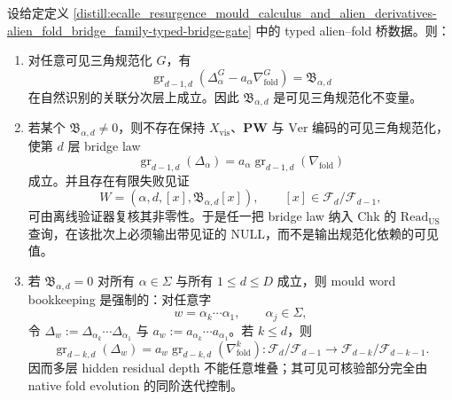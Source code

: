 \begin{theorem}\label{distill:ecalle_resurgence_mould_calculus_and_alien_derivatives-alien_fold_bridge_family-visible-null-bridge-defect-obstruction}
设给定定义 \ref{distill:ecalle_resurgence_mould_calculus_and_alien_derivatives-alien_fold_bridge_family-typed-bridge-gate} 中的 typed alien--fold 桥数据。则：
\begin{enumerate}
  \item 对任意可见三角规范化 \(G\)，有
  \[
  \operatorname{gr}_{d-1,d}(\Delta_\alpha^G-a_\alpha\nabla_{\mathrm{fold}}^G)=\mathfrak B_{\alpha,d}
  \]
  在自然识别的关联分次层上成立。因此 \(\mathfrak B_{\alpha,d}\) 是可见三角规范化不变量。
  \item 若某个 \(\mathfrak B_{\alpha,d}\neq 0\)，则不存在保持 \(X_{\mathrm{vis}}\)、\(\mathbf{PW}\) 与 \(\mathrm{Ver}\) 编码的可见三角规范化，使第 \(d\) 层 bridge law
  \[
  \operatorname{gr}_{d-1,d}(\Delta_\alpha)=a_\alpha\operatorname{gr}_{d-1,d}(\nabla_{\mathrm{fold}})
  \]
  成立。并且存在有限失败见证
  \[
  W=(\alpha,d,[x],\mathfrak B_{\alpha,d}[x]),\qquad [x]\in\mathcal F_d/\mathcal F_{d-1},
  \]
  可由离线验证器复核其非零性。于是任一把 bridge law 纳入 \(\mathrm{Chk}\) 的 \(\mathrm{Read}_{\mathrm{US}}\) 查询，在该批次上必须输出带见证的 \(\mathrm{NULL}\)，而不是输出规范化依赖的可见值。
  \item 若 \(\mathfrak B_{\alpha,d}=0\) 对所有 \(\alpha\in\Sigma\) 与所有 \(1\leq d\leq D\) 成立，则 mould word bookkeeping 是强制的：对任意字
  \[
  w=\alpha_k\cdots\alpha_1,\qquad \alpha_j\in\Sigma,
  \]
  令 \(\Delta_w:=\Delta_{\alpha_k}\cdots\Delta_{\alpha_1}\) 与 \(a_w:=a_{\alpha_k}\cdots a_{\alpha_1}\)。若 \(k\leq d\)，则
  \[
  \operatorname{gr}_{d-k,d}(\Delta_w)=a_w\operatorname{gr}_{d-k,d}(\nabla_{\mathrm{fold}}^k):
  \mathcal F_d/\mathcal F_{d-1}\longrightarrow \mathcal F_{d-k}/\mathcal F_{d-k-1}.
  \]
  因而多层 hidden residual depth 不能任意堆叠；其可见可核验部分完全由 native fold evolution 的同阶迭代控制。
\end{enumerate}
\end{theorem}
